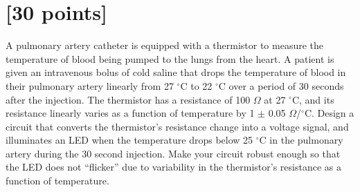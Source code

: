 \documentclass[12pt]{article}
\begin{document}
\clearpage



\clearpage



\section{[30 points]}

A pulmonary artery catheter is equipped with a thermistor to measure the
temperature of blood being pumped to the lungs from the heart.  A patient is
given an intravenous bolus of cold saline that drops the temperature of blood
in their pulmonary artery linearly from 27 $^\circ$C to 22 $^\circ$C over a
period of 30 seconds after the injection.  The thermistor has a resistance of
100 $\Omega$ at 27 $^\circ$C, and its resistance linearly varies as a function
of temperature by 1 $\pm$ 0.05 $\Omega$/$^\circ$C.  Design a circuit that
converts the thermistor's resistance change into a voltage signal, and
illuminates an LED when the temperature drops below 25 $^\circ$C in the
pulmonary artery during the 30 second injection.  Make your circuit robust
enough so that the LED does not ``flicker'' due to variability in the
thermistor's resistance as a function of temperature.

\clearpage


\end{document}
